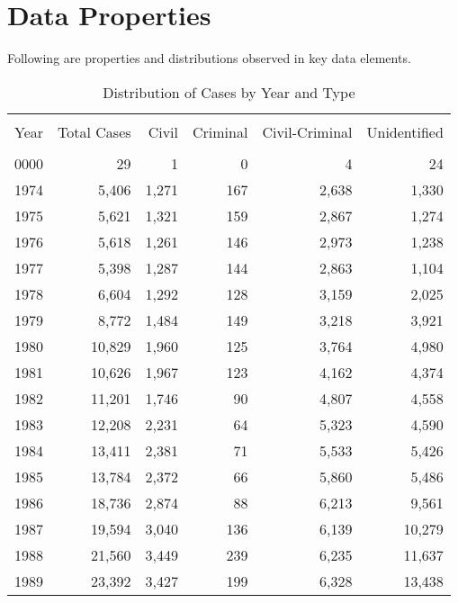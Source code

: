 \documentclass[10pt, letterpaper]{article}
\begin{document}
\begin{spacing}{1.0}
\begin{itemize}
\end{itemize}

\clearpage

\section{Data Properties}

Following are properties and distributions observed in key data elements.\\[12pt]

\begin{table}[h!]
    \small
    \centering
    \caption{Distribution of Cases by Year and Type}
    \begin{tabular}{rrrrrr}
        \hline\\[-8pt]
        Year & Total Cases & Civil & Criminal & Civil-Criminal & Unidentified\\[2pt]
        \hline\\[-6pt]
        0000 & 29 &  1 &  0 &  4 & 24\\
        1974 & 5,406 & 1,271 &   167 & 2,638 & 1,330\\
        1975 & 5,621 & 1,321 &   159 & 2,867 & 1,274\\
        1976 & 5,618 & 1,261 &   146 & 2,973 & 1,238\\
        1977 & 5,398 & 1,287 &   144 & 2,863 & 1,104\\
        1978 & 6,604 & 1,292 &   128 & 3,159 & 2,025\\
        1979 & 8,772 & 1,484 &   149 & 3,218 & 3,921\\
        1980 & 10,829 &  1,960 &    125 &  3,764 &  4,980\\
        1981 & 10,626 &  1,967 &    123 &  4,162 &  4,374\\
        1982 & 11,201 &  1,746 &     90 &  4,807 &  4,558\\
        1983 & 12,208 &  2,231 &     64 &  5,323 &  4,590\\
        1984 & 13,411 &  2,381 &     71 &  5,533 &  5,426\\
        1985 & 13,784 &  2,372 &     66 &  5,860 &  5,486\\
        1986 & 18,736 &  2,874 &     88 &  6,213 &  9,561\\
        1987 & 19,594 &  3,040 &    136 &  6,139 & 10,279\\
        1988 & 21,560 &  3,449 &    239 &  6,235 & 11,637\\
        1989 & 23,392 &  3,427 &    199 &  6,328 & 13,438\\

\end{tabular}
\end{table}
\end{spacing}
\end{document}
